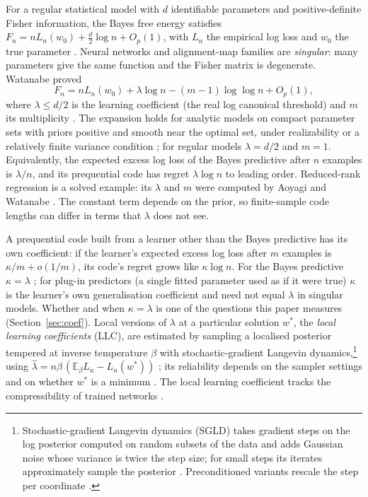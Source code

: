 \documentclass[11pt,a4paper]{article}
\begin{document}
For a regular statistical model with $d$ identifiable parameters and positive-definite Fisher information, the Bayes free energy satisfies $F_n=nL_n(w_0)+\tfrac d2\log n+O_p(1)$, with $L_n$ the empirical log loss and $w_0$ the true parameter \cite{rissanen1986,clarkebarron1990}. Neural networks and alignment-map families are \emph{singular}: many parameters give the same function and the Fisher matrix is degenerate. Watanabe proved
\begin{equation}
F_n=nL_n(w_0)+\lambda\log n-(m-1)\log\log n+O_p(1),
\label{eq:watanabe}
\end{equation}
where $\lambda\le d/2$ is the learning coefficient (the real log canonical threshold) and $m$ its multiplicity \cite{watanabe2009}. The expansion holds for analytic models on compact parameter sets with priors positive and smooth near the optimal set, under realizability or a relatively finite variance condition \cite{watanabe2009,watanabe2018}; for regular models $\lambda=d/2$ and $m=1$. Equivalently, the expected excess log loss of the Bayes predictive after $n$ examples is $\lambda/n$, and its prequential code has regret $\lambda\log n$ to leading order. Reduced-rank regression is a solved example: its $\lambda$ and $m$ were computed by Aoyagi and Watanabe \cite{aoyagiwatanabe2005}. The constant term depends on the prior, so finite-sample code lengths can differ in terms that $\lambda$ does not see.

A prequential code built from a learner other than the Bayes predictive has its own coefficient: if the learner's expected excess log loss after $m$ examples is $\kappa/m+o(1/m)$, its code's regret grows like $\kappa\log n$. For the Bayes predictive $\kappa=\lambda$ \cite{watanabe2009}; for plug-in predictors (a single fitted parameter used as if it were true) $\kappa$ is the learner's own generalisation coefficient and need not equal $\lambda$ in singular models. Whether and when $\kappa=\lambda$ is one of the questions this paper measures (Section~\ref{sec:coef}). Local versions of $\lambda$ at a particular solution $w^*$, the \emph{local learning coefficients} (LLC), are estimated by sampling a localised posterior tempered at inverse temperature $\beta$ with stochastic-gradient Langevin dynamics,\footnote{Stochastic-gradient Langevin dynamics (SGLD) takes gradient steps on the log posterior computed on random subsets of the data and adds Gaussian noise whose variance is twice the step size; for small steps its iterates approximately sample the posterior \cite{wellingteh2011}. Preconditioned variants rescale the step per coordinate \cite{li2016psgld}.} using $\hat\lambda=n\beta\,(\mathbb E_\beta L_n-L_n(w^*))$ \cite{lau2025llc}; its reliability depends on the sampler settings and on whether $w^*$ is a minimum \cite{hitchcock2025,cai2026}. The local learning coefficient tracks the compressibility of trained networks \cite{urdshals2025}.
\end{document}
